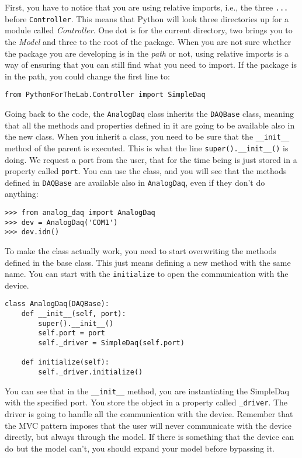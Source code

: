 First, you have to notice that you are using relative imports, i.e., the
three \texttt{...} before \texttt{Controller}. This means that Python
will look three directories up for a module called \emph{Controller}.
One dot is for the current directory, two brings you to the \emph{Model}
and three to the root of the package. When you are not sure whether the
package you are developing is in the \emph{path} or not, using relative
imports is a way of ensuring that you can still find what you need to
import. If the package is in the path, you could change the first
line to:

\begin{verbatim}
from PythonForTheLab.Controller import SimpleDaq
\end{verbatim}

Going back to the code, the \texttt{AnalogDaq} class inherits the
\texttt{DAQBase} class, meaning that all the methods and properties
defined in it are going to be available also in the new class. When you
inherit a class, you need to be sure that the \texttt{__init__}
method of the parent is executed. This is what the line
\texttt{super().__init__()} is doing. We request a port from the
user, that for the time being is just stored in a property called
\texttt{port}. You can use the class, and you will see that the methods
defined in \texttt{DAQBase} are available also in \texttt{AnalogDaq},
even if they don't do anything:

\begin{verbatim}
>>> from analog_daq import AnalogDaq
>>> dev = AnalogDaq('COM1')
>>> dev.idn()
\end{verbatim}

To make the class actually work, you need to start overwriting the
methods defined in the base class. This just means defining a new method
with the same name. You can start with the \texttt{initialize} to open
the communication with the device.

\begin{verbatim}
class AnalogDaq(DAQBase):
    def __init__(self, port):
        super().__init__()
        self.port = port
        self._driver = SimpleDaq(self.port)
    
    def initialize(self):
        self._driver.initialize()
\end{verbatim}

You can see that in the \texttt{__init__} method, you are
instantiating the SimpleDaq with the specified port. You store the
object in a property called \texttt{_driver}. The driver is going to
handle all the communication with the device. Remember that the {MVC}
pattern imposes that the user will never communicate with the device
directly, but always through the model. If there is something that the
device can do but the model can't, you should expand your model before
bypassing it.

